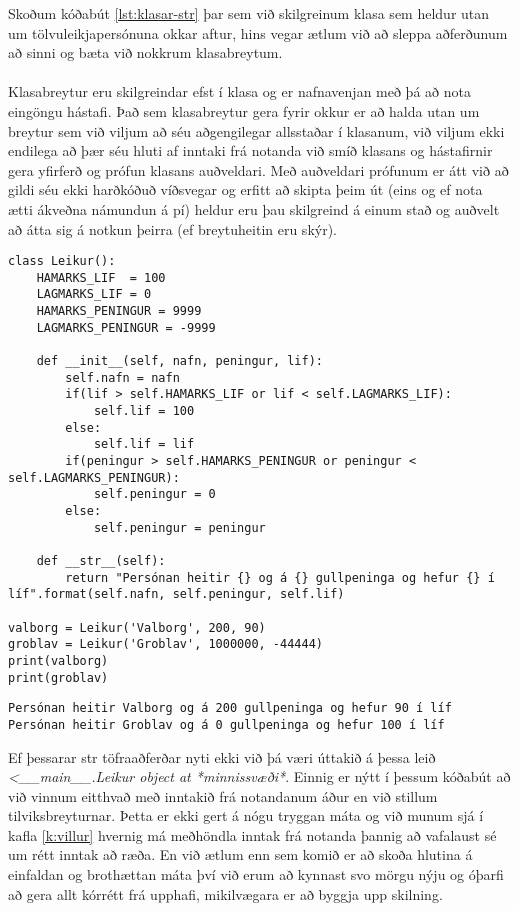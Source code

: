 Skoðum kóðabút \ref{lst:klasar-str} þar sem við skilgreinum klasa sem heldur utan um tölvuleikjapersónuna okkar aftur, hins vegar ætlum við að sleppa aðferðunum að sinni og bæta við nokkrum klasabreytum.

\paragraph{}

Klasabreytur eru skilgreindar efst í klasa og er nafnavenjan með þá að nota eingöngu hástafi.
Það sem klasabreytur gera fyrir okkur er að halda utan um breytur sem við viljum að séu aðgengilegar allsstaðar í klasanum, við viljum ekki endilega að þær séu hluti af inntaki frá notanda við smíð klasans og hástafirnir gera yfirferð og prófun klasans auðveldari.
Með auðveldari prófunum er átt við að gildi séu ekki harðkóðuð víðsvegar og erfitt að skipta þeim út (eins og ef nota ætti ákveðna námundun á pí) heldur eru þau skilgreind á einum stað og auðvelt að átta sig á notkun þeirra (ef breytuheitin eru skýr).

\begin{lstlisting}[caption=Töfraaðferðin \_\_str\_\_, label=lst:klasar-str]
class Leikur():
	HAMARKS_LIF  = 100
	LAGMARKS_LIF = 0
	HAMARKS_PENINGUR = 9999
	LAGMARKS_PENINGUR = -9999
	
	def __init__(self, nafn, peningur, lif):
		self.nafn = nafn
		if(lif > self.HAMARKS_LIF or lif < self.LAGMARKS_LIF):
			self.lif = 100
		else:
			self.lif = lif
		if(peningur > self.HAMARKS_PENINGUR or peningur < self.LAGMARKS_PENINGUR):
			self.peningur = 0
		else:
			self.peningur = peningur
		
	def __str__(self):
		return "Persónan heitir {} og á {} gullpeninga og hefur {} í líf".format(self.nafn, self.peningur, self.lif)

valborg = Leikur('Valborg', 200, 90)
groblav = Leikur('Groblav', 1000000, -44444)
print(valborg)
print(groblav)
\end{lstlisting}
\lstset{style=uttak}
\begin{lstlisting}
Persónan heitir Valborg og á 200 gullpeninga og hefur 90 í líf
Persónan heitir Groblav og á 0 gullpeninga og hefur 100 í líf
\end{lstlisting}
\lstset{style=venjulegt}

Ef þessarar str töfraaðferðar nyti ekki við þá væri úttakið á þessa leið \textit{<\_\_main\_\_.Leikur object at *minnissvæði*}.
Einnig er nýtt í þessum kóðabút að við vinnum eitthvað með inntakið frá notandanum áður en við stillum tilviksbreyturnar.
Þetta er ekki gert á nógu tryggan máta og við munum sjá í kafla \ref{k:villur} hvernig má meðhöndla inntak frá notanda þannig að vafalaust sé um rétt inntak að ræða.
En við ætlum enn sem komið er að skoða hlutina á einfaldan og brothættan máta því við erum að kynnast svo mörgu nýju og óþarfi að gera allt kórrétt frá upphafi, mikilvægara er að byggja upp skilning.

